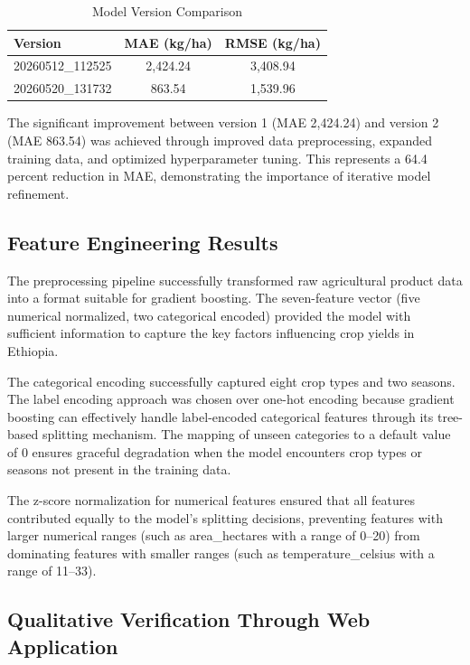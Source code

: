 \begin{table}[H]
\centering
\caption{Model Version Comparison}
\label{tab:model-versions}
\begin{tabular}{lcc}
\toprule
\textbf{Version} & \textbf{MAE (kg/ha)} & \textbf{RMSE (kg/ha)} \\
\midrule
20260512\_112525 & 2,424.24 & 3,408.94 \\
20260520\_131732 & 863.54 & 1,539.96 \\
\bottomrule
\end{tabular}
\end{table}

The significant improvement between version 1 (MAE 2,424.24) and version 2 (MAE 863.54) was achieved through improved data preprocessing, expanded training data, and optimized hyperparameter tuning. This represents a 64.4 percent reduction in MAE, demonstrating the importance of iterative model refinement.

\subsection{Feature Engineering Results}

The preprocessing pipeline successfully transformed raw agricultural product data into a format suitable for gradient boosting. The seven-feature vector (five numerical normalized, two categorical encoded) provided the model with sufficient information to capture the key factors influencing crop yields in Ethiopia.

The categorical encoding successfully captured eight crop types and two seasons. The label encoding approach was chosen over one-hot encoding because gradient boosting can effectively handle label-encoded categorical features through its tree-based splitting mechanism. The mapping of unseen categories to a default value of 0 ensures graceful degradation when the model encounters crop types or seasons not present in the training data.

The z-score normalization for numerical features ensured that all features contributed equally to the model's splitting decisions, preventing features with larger numerical ranges (such as area\_hectares with a range of 0--20) from dominating features with smaller ranges (such as temperature\_celsius with a range of 11--33).

\subsection{Qualitative Verification Through Web Application}

